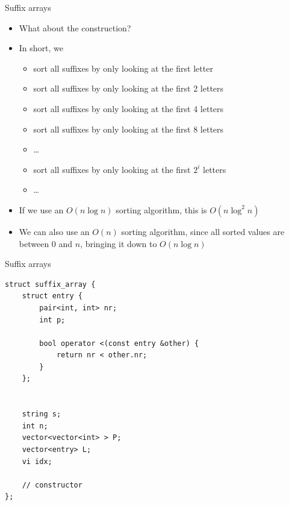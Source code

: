 \documentclass{beamer}
\begin{document}
\begin{frame}{Suffix arrays}
    \begin{itemize}
        \item What about the construction?
        \item In short, we
            \begin{itemize}
                \item sort all suffixes by only looking at the first letter
                \item sort all suffixes by only looking at the first 2 letters
                \item sort all suffixes by only looking at the first 4 letters
                \item sort all suffixes by only looking at the first 8 letters
                \item \ldots
                \item sort all suffixes by only looking at the first $2^i$ letters
                \item \ldots
            \end{itemize}
        \vspace{10pt}
    \item If we use an $O(n\log n)$ sorting algorithm, this is $O(n\log^2 n)$
    \item We can also use an $O(n)$ sorting algorithm, since all sorted values are between $0$ and $n$, bringing it down to $O(n \log n)$
    \end{itemize}
\end{frame}

\begin{frame}[fragile]{Suffix arrays}
    \begin{verbatim}
struct suffix_array {
    struct entry {
        pair<int, int> nr;
        int p;

        bool operator <(const entry &other) {
            return nr < other.nr;
        }
    };


    string s;
    int n;
    vector<vector<int> > P;
    vector<entry> L;
    vi idx;

    // constructor
};
\end{verbatim}
\end{frame}
\end{document}
